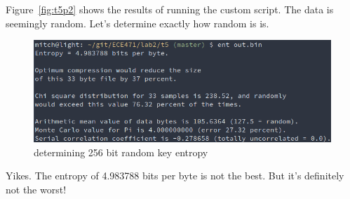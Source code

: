 \documentclass[12pt]{article}
\begin{document}
Figure~\ref{fig:t5p2} shows the results of running the custom script. The data is seemingly random. Let's determine exactly how random is is.

\begin{figure}[H]
    \begin{center}
        \includegraphics[scale=0.6]{t5p3.png}
    \end{center}{}
    \caption{determining 256 bit random key entropy}
    \label{fig:t5p3}
\end{figure}

Yikes. The entropy of 4.983788 bits per byte is not the best. But it's definitely not the worst!
\end{document}

